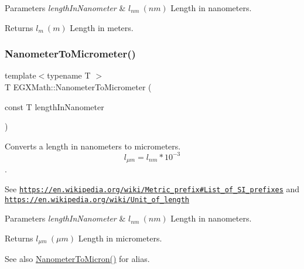 \begin{DoxyParams}{Parameters}
{\em length\+In\+Nanometer} & $ l_{nm}\ (nm)$ Length in nanometers. \\
\hline
\end{DoxyParams}
\begin{DoxyReturn}{Returns}
$ l_{m}\ (m)$ Length in meters. 
\end{DoxyReturn}
\mbox{\label{group___e_g_x_math-_conversions-_length_conversions-_s_i-_nanometer-_s_i_gaa539df5d709bface86429c8a25d7f6e1}} 
\subsubsection{\texorpdfstring{Nanometer\+To\+Micrometer()}{NanometerToMicrometer()}}
{\footnotesize\ttfamily template$<$typename T $>$ \\
T E\+G\+X\+Math\+::\+Nanometer\+To\+Micrometer (\begin{DoxyParamCaption}\item[{const T}]{length\+In\+Nanometer }\end{DoxyParamCaption})}



Converts a length in nanometers to micrometers. \[ l_{\mu m}=l_{nm} * 10^{-3} \]. 

See \href{https://en.wikipedia.org/wiki/Metric_prefix#List_of_SI_prefixes}{\tt https\+://en.\+wikipedia.\+org/wiki/\+Metric\+\_\+prefix\#\+List\+\_\+of\+\_\+\+S\+I\+\_\+prefixes} and \href{https://en.wikipedia.org/wiki/Unit_of_length}{\tt https\+://en.\+wikipedia.\+org/wiki/\+Unit\+\_\+of\+\_\+length} 
\begin{DoxyParams}{Parameters}
{\em length\+In\+Nanometer} & $ l_{nm}\ (nm)$ Length in nanometers. \\
\hline
\end{DoxyParams}
\begin{DoxyReturn}{Returns}
$ l_{\mu m}\ (\mu m)$ Length in micrometers. 
\end{DoxyReturn}
\begin{DoxySeeAlso}{See also}
\mbox{\hyperlink{group___e_g_x_math-_conversions-_length_conversions-_s_i-_nanometer-_non-_s_i_ga278b008cafd5027568e16cbc8af7fb6a}{Nanometer\+To\+Micron()}} for alias. 
\end{DoxySeeAlso}
\mbox{\label{group___e_g_x_math-_conversions-_length_conversions-_s_i-_nanometer-_s_i_gac8b870837f9a0213c8383079437e8cc6}} 
